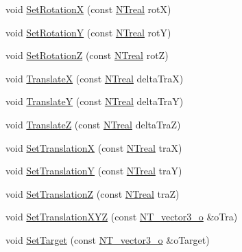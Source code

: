 \begin{DoxyCompactItemize}
\item 
void \hyperlink{class_n_t3_d__camera__vp__o_a0ca4d1f626d76dd61aa945873a88f7a7}{SetRotationX} (const \hyperlink{nt__types_8h_a814a97893e9deb1eedcc7604529ba80d}{NTreal} rotX)
\item 
void \hyperlink{class_n_t3_d__camera__vp__o_a36228480ad2773b102cd5f8e0689fc58}{SetRotationY} (const \hyperlink{nt__types_8h_a814a97893e9deb1eedcc7604529ba80d}{NTreal} rotY)
\item 
void \hyperlink{class_n_t3_d__camera__vp__o_a288fbdf87dd72637db3993f9924deb46}{SetRotationZ} (const \hyperlink{nt__types_8h_a814a97893e9deb1eedcc7604529ba80d}{NTreal} rotZ)
\item 
void \hyperlink{class_n_t3_d__camera__vp__o_adc885d01e527a7cd8e85f05649a52edd}{TranslateX} (const \hyperlink{nt__types_8h_a814a97893e9deb1eedcc7604529ba80d}{NTreal} deltaTraX)
\item 
void \hyperlink{class_n_t3_d__camera__vp__o_a565e5eedfdae3b705624f53f54aaf17d}{TranslateY} (const \hyperlink{nt__types_8h_a814a97893e9deb1eedcc7604529ba80d}{NTreal} deltaTraY)
\item 
void \hyperlink{class_n_t3_d__camera__vp__o_ac9aa4602bf59554de8ff28529e74a385}{TranslateZ} (const \hyperlink{nt__types_8h_a814a97893e9deb1eedcc7604529ba80d}{NTreal} deltaTraZ)
\item 
void \hyperlink{class_n_t3_d__camera__vp__o_a97df871798c11779196b411c73d0ca58}{SetTranslationX} (const \hyperlink{nt__types_8h_a814a97893e9deb1eedcc7604529ba80d}{NTreal} traX)
\item 
void \hyperlink{class_n_t3_d__camera__vp__o_ad78edbb76de80ac3d3c2cc3a71d7d7b8}{SetTranslationY} (const \hyperlink{nt__types_8h_a814a97893e9deb1eedcc7604529ba80d}{NTreal} traY)
\item 
void \hyperlink{class_n_t3_d__camera__vp__o_ad8a83270d6af7491a346eaf7e7bc889c}{SetTranslationZ} (const \hyperlink{nt__types_8h_a814a97893e9deb1eedcc7604529ba80d}{NTreal} traZ)
\item 
void \hyperlink{class_n_t3_d__camera__vp__o_a27d6dfa3bd5433c7b38865ec5c0b7ae6}{SetTranslationXYZ} (const \hyperlink{class_n_t__vector3__o}{NT\_\-vector3\_\-o} \&oTra)
\item 
void \hyperlink{class_n_t3_d__camera__vp__o_ab44d2af0d122220b7033bfcdf2261443}{SetTarget} (const \hyperlink{class_n_t__vector3__o}{NT\_\-vector3\_\-o} \&oTarget)
\end{DoxyCompactItemize}
